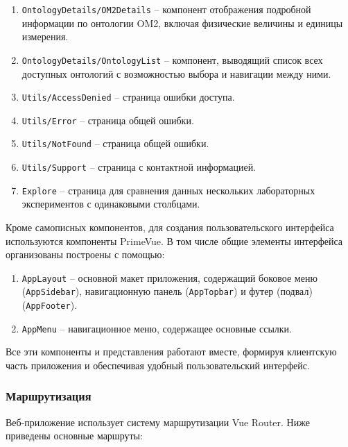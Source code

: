 \begin{enumerate}
\item \texttt{OntologyDetails/OM2Details} -- компонент отображения подробной информации по онтологии OM2, включая физические величины и единицы измерения.
\item \texttt{OntologyDetails/OntologyList} -- компонент, выводящий список всех доступных онтологий с возможностью выбора и навигации между ними.
\item \texttt{Utils/AccessDenied} -- страница ошибки доступа.
\item \texttt{Utils/Error} -- страница общей ошибки.
\item \texttt{Utils/NotFound} -- страница общей ошибки.
\item \texttt{Utils/Support} -- страница с контактной информацией.
\item \texttt{Explore} -- страница для сравнения данных нескольких лабораторных экспериментов с одинаковыми столбцами.
\end{enumerate}

Кроме самописных компонентов, для создания пользовательского интерфейса используются компоненты PrimeVue.
В том числе общие элементы интерфейса организованы построены с помощью:

\begin{enumerate}
\item \texttt{AppLayout} -- основной макет приложения, содержащий боковое меню (\texttt{AppSidebar}), навигационную панель (\texttt{AppTopbar}) и футер (подвал) (\texttt{AppFooter}).
\item \texttt{AppMenu} -- навигационное меню, содержащее основные ссылки.
\end{enumerate}

Все эти компоненты и представления работают вместе, формируя клиентскую часть приложения и обеспечивая удобный пользовательский интерфейс.

\subsubsection{Маршрутизация}

Веб-приложение использует систему маршрутизации Vue Router.
Ниже приведены основные маршруты:

